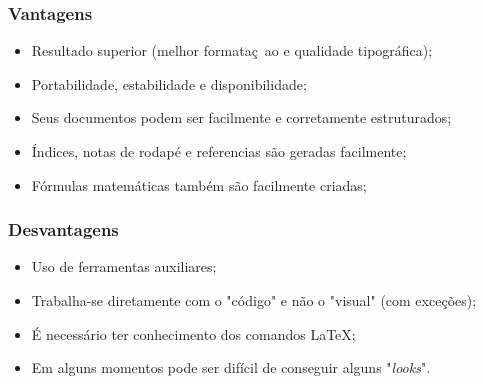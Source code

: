 \begin{frame}
\frametitle{Vantagens}

\begin{itemize}

\item Resultado superior (melhor formata{\c c}~ao e qualidade tipogr\'afica);
\item Portabilidade, estabilidade e disponibilidade;
\item Seus documentos podem ser facilmente e corretamente estruturados;
\item \'Indices, notas de rodap\'e e referencias s\~ao geradas facilmente;
\item F\'ormulas matem\'aticas tamb\'em s\~ao facilmente criadas;

\end{itemize}
\end{frame}

\begin{frame}
\frametitle{Desvantagens}

\begin{itemize}

\item Uso de ferramentas auxiliares;
\item Trabalha-se diretamente com o "c\'odigo" e n\~ao o "visual" (com exce{\c c}\~oes);
\item \'E necess\'ario ter conhecimento dos comandos \LaTeX;
\item Em alguns momentos pode ser dif\'icil de conseguir alguns "\textit{looks}".

\end{itemize}
\end{frame}
